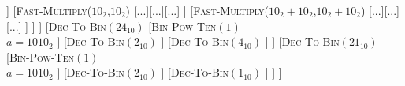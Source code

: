 \documentclass[12pt]{standalone}%
\begin{document}
	\begin{forest}
		[\textsc{Dec-To-Bin}$(2421_{10})$
			[\textsc{Bin-Pow-Ten}$(2)$ \\ {$n=2$}
				[\textsc{Bin-Pow-Ten}$(1)$\\{$a=1010_2$} ]
				[\textsc{Fast-Multiply}($a${,}$a$)\\{$a=1010_2$}
					[\textsc{Fast-Multiply}($10_2${,}$10_2$)
						[...][...][...]
					]
					[\textsc{Fast-Multiply}($10_2${,}$10_2$)
						[...][...][...]
					]
					[\textsc{Fast-Multiply}($10_2 + 10_2${,}$10_2 + 10_2$)
						[...][...][...]
					]
				]
			]
			[\textsc{Dec-To-Bin}$(24_{10})$
					[\textsc{Bin-Pow-Ten}$(1)$\\{$a=1010_2$}
					]
					[\textsc{Dec-To-Bin}$(2_{10})$
					]
					[\textsc{Dec-To-Bin}$(4_{10})$
					]
			]
			[\textsc{Dec-To-Bin}$(21_{10})$
				[\textsc{Bin-Pow-Ten}$(1)$\\{$a=1010_2$}
				]
				[\textsc{Dec-To-Bin}$(2_{10})$
				]
				[\textsc{Dec-To-Bin}$(1_{10})$
				]
			]
		]
	\end{forest}
\end{document}
